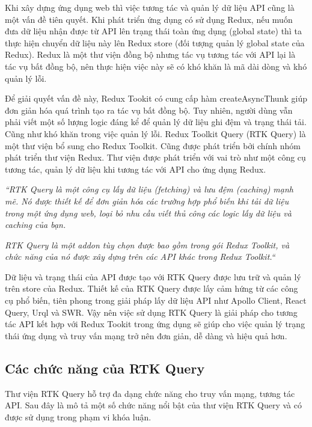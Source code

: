 \tab \tab Khi xây dựng ứng dụng web thì việc tương tác và quản lý dữ liệu API cũng là một vấn đề tiên quyết.
Khi phát triển ứng dụng có sử dụng Redux, nếu muốn đưa dữ liệu nhận được từ API lên trạng thái toàn ứng dụng (global state) thì ta thực hiện chuyển dữ liệu này lên Redux store (đối tượng quản lý global state của Redux).
Redux là một thư viện đồng bộ nhưng tác vụ tương tác với API lại là tác vụ bất đồng bộ, nên thực hiện việc này sẽ có khó khăn là mã dài dòng và khó quản lý lỗi.

Để giải quyết vấn đề này, Redux Tookit có cung cấp hàm createAsyncThunk giúp đơn giản hóa quá trình tạo ra tác vụ bất đồng bộ.
Tuy nhiên, người dùng vẫn phải viết một số lượng logic đáng kể để quản lý dữ liệu ghi đệm và trạng thái tải.
Cũng như khó khăn trong việc quản lý lỗi.
Redux Toolkit Query (RTK Query) là một thư viện bổ sung cho Redux Toolkit.
Cũng được phát triển bởi chính nhóm phát triển thư viện Redux.
Thư viện được phát triển với vai trò như một công cụ tương tác, quản lý dữ liệu khi tương tác với API cho ứng dụng Redux.
\par

\textit{“RTK Query là một công cụ lấy dữ liệu (fetching) và lưu đệm (caching) mạnh mẽ.
      Nó được thiết kế để đơn giản hóa các trường hợp phổ biến khi tải dữ liệu trong một ứng dụng web, loại bỏ nhu cầu viết thủ công các logic lấy dữ liệu và caching của bạn.}
\par

\textit{RTK Query là một addon tùy chọn được bao gồm trong gói Redux Toolkit, và chức năng của nó được xây dựng trên các API khác trong Redux Toolkit.“} \cite{chap4bib2}
\par

Dữ liệu và trạng thái của API được tạo với RTK Query được lưu trữ và quản lý trên store của Redux.
Thiết kế của RTK Query được lấy cảm hứng từ các công cụ phổ biến, tiên phong trong giải pháp lấy dữ liệu API như Apollo Client, React Query, Urql và SWR.
Vậy nên việc sử dụng RTK Query là giải pháp cho tương tác API kết hợp với Redux Tookit trong ứng dụng sẽ giúp cho việc quản lý trạng thái ứng dụng và truy vấn mạng trở nên đơn giản, dễ dàng và hiệu quả hơn.

\subsection{Các chức năng của RTK Query} \label{subsec:CacChucNangRTKQuery}

\tab Thư viện RTK Query hỗ trợ đa dạng chức năng cho truy vấn mạng, tương tác API.
Sau đây là mô tả một số chức năng nổi bật của thư viện RTK Query và có được sử dụng trong phạm vi khóa luận.

